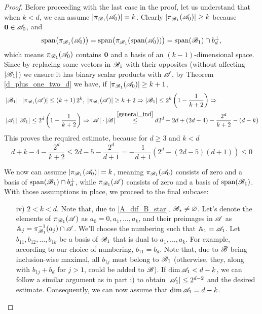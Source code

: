 \begin{proof}
        \noindent Before proceeding with the last case in the proof, let us understand that when $k < d$, we can assume $\left|\pi_{{\mathscr{B}}_1}({\mathscr{A}}_0)\right|=k$. Clearly $\left|\pi_{{\mathscr{B}}_1}({\mathscr{A}}_0)\right|\geq k$ because $\mathbf{0}\in{\mathscr{A}}_0$, and 
        \[
            \operatorname{span}\bigl(\pi_{{\mathscr{B}}_1}({\mathscr{A}}_0)\bigr)=\operatorname{span}\bigl(\pi_{{\mathscr{B}}_1}(\operatorname{span}({\mathscr{A}}_0))\bigr)=\operatorname{span}({\mathscr{B}}_1)\cap b_d^\bot,
        \]
        which means $\pi_{{\mathscr{B}}_1}({\mathscr{A}}_0)$ contains $\mathbf{0}$ and a basis of an $(k-1)$-dimensional space. Since by replacing some vectors in ${\mathscr{B}}_1$ with their opposites (without affecting $|{\mathscr{B}}_1|$) we ensure it has binary scalar products with ${\mathscr{A}}$, by Theorem \ref{d_plus_one_two_d} we have, if $\left|\pi_{{\mathscr{B}}_1}({\mathscr{A}}_0)\right|\geq k+1$,
        \begin{align}
            & \left|{\mathscr{B}}_1\right|\cdot\left|\pi_{{\mathscr{B}}_1}({\mathscr{A}})\right|\leq\left(k+1\right)2^k,\;\left|\pi_{{\mathscr{B}}_1}({\mathscr{A}})\right|\geq k+2 \Rightarrow \left|{\mathscr{B}}_1\right| \leq 2^k\left(1-\frac{1}{k+2}\right) \Rightarrow \nonumber \\
            & \left|{\mathscr{A}}_1\right|\left|{\mathscr{B}}_1\right| \leq 2^d\left(1-\frac{1}{k+2}\right) \Rightarrow \left|{\mathscr{A}}\right|\cdot\left|{\mathscr{B}}\right|\stackrel{\eqref{general_ind}}{\leq} d 2^d + 2d + (2d-4)- \frac{2^d}{k+2}-(d-k) \nonumber
        \end{align}
        This proves the required estimate, because for $d \geq 3$ and $k < d$
        \begin{equation*}
            d+k-4-\frac{2^d}{k+2}\leq2d-5-\frac{2^d}{d+1}=-\frac{1}{d+1}\left(2^d - (2d-5)(d+1)\right)\leq 0
        \end{equation*}

        \noindent We now can assume $\left|\pi_{{\mathscr{B}}_1}({\mathscr{A}}_0)\right|=k$, meaning $\pi_{{\mathscr{B}}_1}({\mathscr{A}}_0)$ consists of zero and a basis of $\operatorname{span}({\mathscr{B}}_1) \cap b_d^\bot$, while $\pi_{{\mathscr{B}}_1}({\mathscr{A}})$ consists of zero and a basis of $\operatorname{span}({\mathscr{B}}_1)$. With those assumptions in place, we proceed to the final subcase: 
        
        \begin{enumerate}
            \item[iv)] $2 < k < d$. Note that, due to \eqref{A_dif_B_star}, ${\mathscr{B}}_* \neq \varnothing$. Let's denote the elements of $\pi_{{\mathscr{B}}_1}({\mathscr{A}})$ as $a_0 = 0, a_1, \ldots, a_k$, and their preimages in ${\mathscr{A}}$ as $\mathbb{A}_j=\pi_{{\mathscr{B}}_1}^{-1}(a_j)\cap{\mathscr{A}}$. We'll choose the numbering such that $\mathbb{A}_1={\mathscr{A}}_1$. Let $b_{11}, b_{12}, \ldots, b_{1k}$ be a basis of ${\mathscr{B}}_1$ that is dual to $a_1, \ldots, a_k$. For example, according to our choice of numbering, $b_{11}=b_d$. Note that, due to ${\mathscr{B}}$ being inclusion-wise maximal, all $b_{1j}$ must belong to ${\mathscr{B}}_1$ (otherwise, they, along with $b_{1j}+b_d$ for $j>1$, could be added to ${\mathscr{B}}$). If $\operatorname{dim}{\mathscr{A}}_1 < d-k$, we can follow a similar argument as in part i) to obtain $\left|{\mathscr{A}}_1\right|\leq2^{d-2}$ and the desired estimate. Consequently, we can now assume that $\operatorname{dim}{\mathscr{A}}_1=d-k$.


\end{enumerate}
\end{proof}

